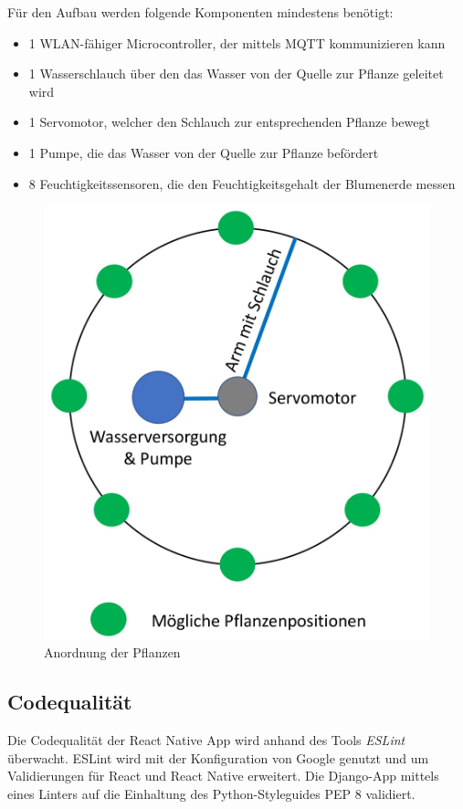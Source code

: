         Für den Aufbau werden folgende Komponenten mindestens benötigt:
        \begin{itemize}
            \item 1 WLAN-fähiger Microcontroller, der mittels MQTT kommunizieren kann
            \item 1 Wasserschlauch über den das Wasser von der Quelle zur Pflanze geleitet wird
            \item 1 Servomotor, welcher den Schlauch zur entsprechenden Pflanze bewegt
            \item 1 Pumpe, die das Wasser von der Quelle zur Pflanze befördert
           \item 8 Feuchtigkeitssensoren, die den Feuchtigkeitsgehalt der Blumenerde messen
        \end{itemize}
        \begin{figure}
            \centering
            \includegraphics[width=0.6\linewidth]{Pictures/Konzept/Position}
            \caption{Anordnung der Pflanzen}
            \label{fig:position}
        \end{figure}
    
        \subsection{Codequalität}
        Die Codequalität der React Native App wird anhand des Tools \textit{ESLint} überwacht. ESLint wird mit der Konfiguration von Google genutzt und um Validierungen für React und React Native erweitert.
        Die Django-App mittels eines Linters auf die Einhaltung des Python-Styleguides PEP 8 validiert.
        